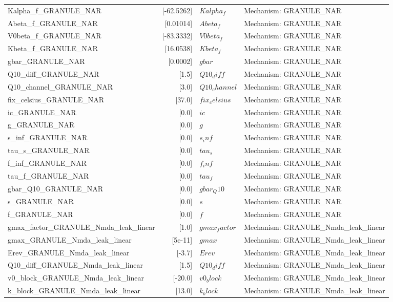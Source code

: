 \begin{tabular}{|l|r|l|l|}
Kalpha_f_GRANULE_NAR & [-62.5262] & $Kalpha_f$ & Mechanism: GRANULE_NAR \\
Abeta_f_GRANULE_NAR & [0.01014] & $Abeta_f$ & Mechanism: GRANULE_NAR \\
V0beta_f_GRANULE_NAR & [-83.3332] & $V0beta_f$ & Mechanism: GRANULE_NAR \\
Kbeta_f_GRANULE_NAR & [16.0538] & $Kbeta_f$ & Mechanism: GRANULE_NAR \\
gbar_GRANULE_NAR & [0.0002] & $gbar$ & Mechanism: GRANULE_NAR \\
Q10_diff_GRANULE_NAR & [1.5] & $Q10_diff$ & Mechanism: GRANULE_NAR \\
Q10_channel_GRANULE_NAR & [3.0] & $Q10_channel$ & Mechanism: GRANULE_NAR \\
fix_celsius_GRANULE_NAR & [37.0] & $fix_celsius$ & Mechanism: GRANULE_NAR \\
ic_GRANULE_NAR & [0.0] & $ic$ & Mechanism: GRANULE_NAR \\
g_GRANULE_NAR & [0.0] & $g$ & Mechanism: GRANULE_NAR \\
s_inf_GRANULE_NAR & [0.0] & $s_inf$ & Mechanism: GRANULE_NAR \\
tau_s_GRANULE_NAR & [0.0] & $tau_s$ & Mechanism: GRANULE_NAR \\
f_inf_GRANULE_NAR & [0.0] & $f_inf$ & Mechanism: GRANULE_NAR \\
tau_f_GRANULE_NAR & [0.0] & $tau_f$ & Mechanism: GRANULE_NAR \\
gbar_Q10_GRANULE_NAR & [0.0] & $gbar_Q10$ & Mechanism: GRANULE_NAR \\
s_GRANULE_NAR & [0.0] & $s$ & Mechanism: GRANULE_NAR \\
f_GRANULE_NAR & [0.0] & $f$ & Mechanism: GRANULE_NAR \\
gmax_factor_GRANULE_Nmda_leak_linear & [1.0] & $gmax_factor$ & Mechanism: GRANULE_Nmda_leak_linear \\
gmax_GRANULE_Nmda_leak_linear & [5e-11] & $gmax$ & Mechanism: GRANULE_Nmda_leak_linear \\
Erev_GRANULE_Nmda_leak_linear & [-3.7] & $Erev$ & Mechanism: GRANULE_Nmda_leak_linear \\
Q10_diff_GRANULE_Nmda_leak_linear & [1.5] & $Q10_diff$ & Mechanism: GRANULE_Nmda_leak_linear \\
v0_block_GRANULE_Nmda_leak_linear & [-20.0] & $v0_block$ & Mechanism: GRANULE_Nmda_leak_linear \\
k_block_GRANULE_Nmda_leak_linear & [13.0] & $k_block$ & Mechanism: GRANULE_Nmda_leak_linear \\

\end{tabular}
